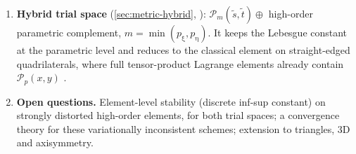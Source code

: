 \begin{enumerate}
    (\cref{ch:metric-basis}). Monomials make $\matr V$ exponentially
    ill-conditioned already on affine elements \parencite{Gautschi1988Lower}; the
    Lagrange basis of the reference element removes this part. The remaining,
    basis-independent growth on distorted elements is that of the Lebesgue constant
    of $\mathcal Q_p(s,t)$-interpolation on the mapped nodes.
  \item \textbf{Hybrid trial space} (\cref{sec:metric-hybrid},
    ): $\mathcal P_m(\tilde s,\tilde t)\oplus$ high-order parametric
    complement, $m=\min(p_\upxi,p_\upeta)$. It keeps
    the Lebesgue constant at the parametric level and reduces to the classical
    element on straight-edged quadrilaterals, where full tensor-product Lagrange
    elements already contain $\mathcal P_p(x,y)$ \parencite{Arnold2002Approximation}.
  \item \textbf{Open questions.} Element-level stability (discrete inf-sup
    constant) on strongly distorted high-order elements, for both trial spaces;
    a convergence theory for these variationally inconsistent schemes; extension to
    triangles, 3D and axisymmetry.
\end{enumerate}
